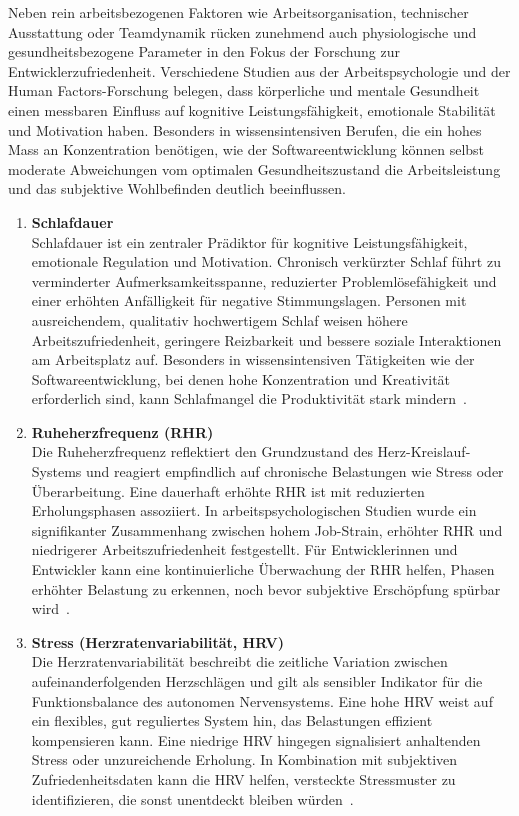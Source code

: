 \documentclass[12pt,a4paper]{report}
\begin{document}
Neben rein arbeitsbezogenen Faktoren wie Arbeitsorganisation, technischer Ausstattung oder Teamdynamik rücken zunehmend auch
physiologische und gesundheitsbezogene Parameter in den Fokus der Forschung zur Entwicklerzufriedenheit. Verschiedene Studien aus
der Arbeitspsychologie und der Human Factors-Forschung belegen, dass körperliche und mentale Gesundheit einen messbaren Einfluss
auf kognitive Leistungsfähigkeit, emotionale Stabilität und Motivation haben. Besonders in wissensintensiven Berufen, die ein
hohes Mass an Konzentration benötigen, wie der Softwareentwicklung können selbst moderate Abweichungen vom optimalen Gesundheitszustand die
Arbeitsleistung und das subjektive Wohlbefinden deutlich beeinflussen.

\begin{enumerate}
  \item \textbf{Schlafdauer}\\
        Schlafdauer ist ein zentraler Prädiktor für kognitive Leistungsfähigkeit, emotionale Regulation und Motivation. Chronisch 
        verkürzter Schlaf führt zu verminderter Aufmerksamkeitsspanne, reduzierter Problemlösefähigkeit und einer erhöhten 
        Anfälligkeit für negative Stimmungslagen. Personen mit ausreichendem, qualitativ hochwertigem Schlaf weisen höhere
        Arbeitszufriedenheit, geringere Reizbarkeit und bessere soziale Interaktionen am Arbeitsplatz auf. Besonders in
        wissensintensiven Tätigkeiten wie der Softwareentwicklung, bei denen hohe Konzentration und Kreativität erforderlich sind,
        kann Schlafmangel die Produktivität stark mindern~\cite{opoku_sleep_2023}.

  \item \textbf{Ruheherzfrequenz (RHR)}\\
        Die Ruheherzfrequenz reflektiert den Grundzustand des Herz-Kreislauf-Systems und reagiert empfindlich auf chronische 
        Belastungen wie Stress oder Überarbeitung. Eine dauerhaft erhöhte RHR ist mit  reduzierten Erholungsphasen assoziiert.
        In arbeitspsychologischen Studien wurde ein signifikanter Zusammenhang zwischen hohem Job-Strain, erhöhter RHR
        und niedrigerer Arbeitszufriedenheit festgestellt. Für Entwicklerinnen und Entwickler kann eine kontinuierliche Überwachung der RHR
        helfen, Phasen erhöhter Belastung zu erkennen, noch bevor subjektive Erschöpfung spürbar wird~\cite{eriksson_rhr_2016}.

  \item \textbf{Stress (Herzratenvariabilität, HRV)}\\
        Die Herzratenvariabilität beschreibt die zeitliche Variation zwischen aufeinanderfolgenden Herzschlägen und gilt als
        sensibler Indikator für die Funktionsbalance des autonomen Nervensystems. Eine hohe HRV weist auf ein flexibles, gut
        reguliertes System hin, das Belastungen effizient kompensieren kann. Eine niedrige HRV hingegen signalisiert anhaltenden
        Stress oder unzureichende Erholung. In Kombination mit subjektiven Zufriedenheitsdaten kann die HRV helfen, versteckte
        Stressmuster zu identifizieren, die sonst unentdeckt bleiben würden~\cite{borchini_hrv_2012}.


\end{enumerate}
\end{document}

